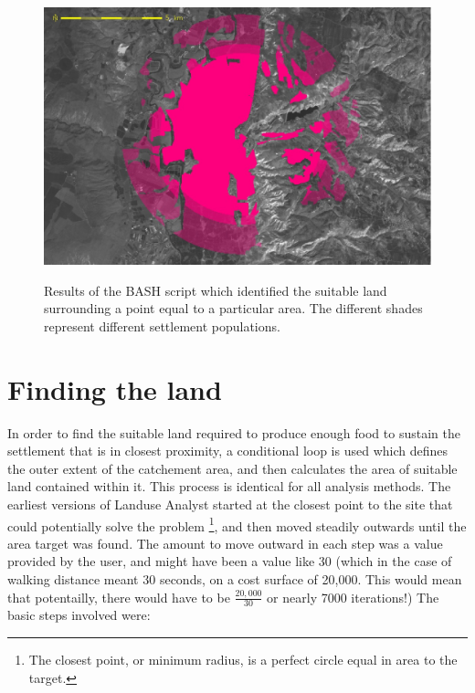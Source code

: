   \begin{figure}[htbp] %
  \includegraphics[scale=0.225]{./images/landcatchment.jpg}
   \label{fig:landCatchment} \caption{Results of the BASH script which
   identified the suitable land surrounding a point equal to a particular area.
   The different shades represent different settlement populations.}
   \end{figure}

\section{Finding the land} 

In order to find the suitable land required
to produce enough food to sustain the settlement that is in closest proximity, 
a conditional loop is used which defines the outer extent of the catchement area, 
and then calculates the area of suitable land contained within it.  This process is identical for all
analysis methods.  The earliest versions of Landuse Analyst started at the
closest point to the site that could potentially solve the problem
\footnote{The closest point, or minimum radius, is a perfect circle equal in
area to the target.}, and then moved steadily outwards until the area target
was found.  The amount to move outward in each step was a value provided by the
user, and might have been a value like 30 (which in the case of walking
distance meant 30 seconds, on  a cost surface of 20,000.  This would mean that
potentailly, there would have to be $\frac{20,000}{30}$ or nearly 7000 iterations!)
The basic steps involved were:

